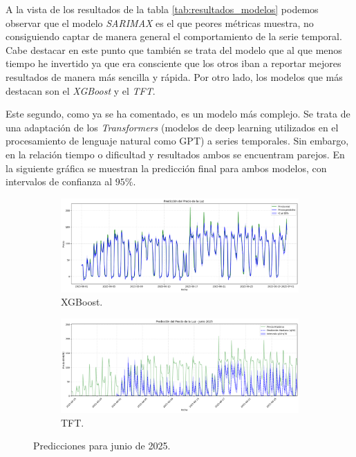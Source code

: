 A la vista de los resultados de la tabla \ref{tab:resultados_modelos} podemos observar que el modelo \textit{SARIMAX} es el que peores métricas muestra, no consiguiendo captar de manera general el comportamiento de la serie temporal. Cabe destacar en este punto que también se trata del modelo que al que menos tiempo he invertido ya que era consciente que los otros iban a reportar mejores resultados de manera más sencilla y rápida. Por otro lado, los modelos que más destacan son el \textit{XGBoost} y el \textit{TFT}.

Este segundo, como ya se ha comentado, es un modelo más complejo. Se trata de una adaptación de los \textit{Transformers} (modelos de deep learning utilizados en el procesamiento de lenguaje natural como GPT) a series temporales. Sin embargo, en la relación tiempo o dificultad y resultados ambos se encuentram parejos. En la siguiente gráfica se muestran la predicción final para ambos modelos, con intervalos de confianza al $95\%$.
\begin{figure}[H]
\centering
\begin{subfigure}[b]{0.45\textwidth}
\centering
\includegraphics[width=\textwidth]{figuras/XGBoost_prediccion.png}
\caption[Predicción mediante XGBoost]{XGBoost.}
\label{PrediccionXGBoost}
\end{subfigure}
\begin{subfigure}[b]{0.45\textwidth}
\centering
\includegraphics[width=\textwidth]{figuras/TFT_predCon1.png}
\caption[Predicción mediante TFT]{TFT.}
\label{PrediccionTFT}
\end{subfigure}
\caption{Predicciones para junio de 2025.}
\label{PrediccionesLuz}
\end{figure}

